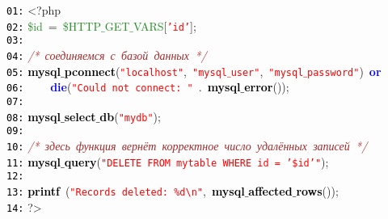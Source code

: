 \documentclass[a4paper,12pt]{article}
\begin{document}
\mbox{}\texttt{\textcolor{Black}{01:}} \textcolor{BrickRed}{\textless{}?php} \\
\mbox{}\texttt{\textcolor{Black}{02:}} \textcolor{ForestGreen}{\$id}\ \textcolor{BrickRed}{=}\ \textcolor{ForestGreen}{\$HTTP$\_$GET$\_$VARS}\textcolor{BrickRed}{[}\texttt{\textcolor{Red}{'id'}}\textcolor{BrickRed}{];} \\
\mbox{}\texttt{\textcolor{Black}{03:}}  \\
\mbox{}\texttt{\textcolor{Black}{04:}} \textit{\textcolor{Brown}{/*\ соединяемся\ с\ базой\ данных\ */}} \\
\mbox{}\texttt{\textcolor{Black}{05:}} \textbf{\textcolor{Black}{mysql$\_$pconnect}}\textcolor{BrickRed}{(}\texttt{\textcolor{Red}{"{}localhost"{}}}\textcolor{BrickRed}{,}\ \texttt{\textcolor{Red}{"{}mysql$\_$user"{}}}\textcolor{BrickRed}{,}\ \texttt{\textcolor{Red}{"{}mysql$\_$password"{}}}\textcolor{BrickRed}{)}\ \textbf{\textcolor{Blue}{or}} \\
\mbox{}\texttt{\textcolor{Black}{06:}} \ \ \ \ \textbf{\textcolor{Blue}{die}}\textcolor{BrickRed}{(}\texttt{\textcolor{Red}{"{}Could\ not\ connect:\ "{}}}\ \textcolor{BrickRed}{.}\ \textbf{\textcolor{Black}{mysql$\_$error}}\textcolor{BrickRed}{());} \\
\mbox{}\texttt{\textcolor{Black}{07:}}  \\
\mbox{}\texttt{\textcolor{Black}{08:}} \textbf{\textcolor{Black}{mysql$\_$select$\_$db}}\textcolor{BrickRed}{(}\texttt{\textcolor{Red}{"{}mydb"{}}}\textcolor{BrickRed}{);} \\
\mbox{}\texttt{\textcolor{Black}{09:}}  \\
\mbox{}\texttt{\textcolor{Black}{10:}} \textit{\textcolor{Brown}{/*\ здесь\ функция\ вернёт\ корректное\ число\ удалённых\ записей\ */}} \\
\mbox{}\texttt{\textcolor{Black}{11:}} \textbf{\textcolor{Black}{mysql$\_$query}}\textcolor{BrickRed}{(}\texttt{\textcolor{Red}{"{}DELETE\ FROM\ mytable\ WHERE\ id\ =\ '\$id'"{}}}\textcolor{BrickRed}{);} \\
\mbox{}\texttt{\textcolor{Black}{12:}}  \\
\mbox{}\texttt{\textcolor{Black}{13:}} \textbf{\textcolor{Black}{printf}}\ \textcolor{BrickRed}{(}\texttt{\textcolor{Red}{"{}Records\ deleted:\ \%d\textbackslash{}n"{}}}\textcolor{BrickRed}{,}\ \textbf{\textcolor{Black}{mysql$\_$affected$\_$rows}}\textcolor{BrickRed}{());} \\
\mbox{}\texttt{\textcolor{Black}{14:}} \textcolor{BrickRed}{?\textgreater{}} \\
\end{document}
